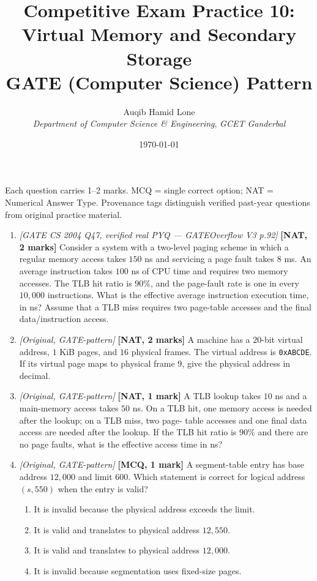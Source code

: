 \documentclass[11pt]{article}
\title{Competitive Exam Practice 10: Virtual Memory and Secondary Storage\\
  \large GATE (Computer Science) Pattern}
\author{Auqib Hamid Lone\\[0.3em]
  \emph{Department of Computer Science \& Engineering}, \emph{GCET Ganderbal}}
\date{\today}
\begin{document}
\maketitle

\noindent Each question carries 1--2 marks. MCQ = single correct option;
NAT = Numerical Answer Type. Provenance tags distinguish verified past-year
questions from original practice material.

\begin{enumerate}
\item[\textbf{Q1}] \textit{[GATE CS 2004 Q47, verified real PYQ ---
GATEOverflow V3 p.92]} \textbf{[NAT, 2 marks]} Consider a system with a
two-level paging scheme in which a regular memory access takes $150$ ns and
servicing a page fault takes $8$ ms. An average instruction takes $100$ ns of
CPU time and requires two memory accesses. The TLB hit ratio is $90\%$, and
the page-fault rate is one in every $10{,}000$ instructions. What is the
effective average instruction execution time, in ns? Assume that a TLB miss
requires two page-table accesses and the final data/instruction access.

\item[\textbf{Q2}] \textit{[Original, GATE-pattern]} \textbf{[NAT, 2 marks]}
A machine has a $20$-bit virtual address, $1$ KiB pages, and $16$ physical
frames. The virtual address is \texttt{0xABCDE}. If its virtual page maps to
physical frame $9$, give the physical address in decimal.

\item[\textbf{Q3}] \textit{[Original, GATE-pattern]} \textbf{[NAT, 1 mark]}
A TLB lookup takes $10$ ns and a main-memory access takes $50$ ns. On a TLB
hit, one memory access is needed after the lookup; on a TLB miss, two page-
table accesses and one final data access are needed after the lookup. If the
TLB hit ratio is $90\%$ and there are no page faults, what is the effective
access time in ns?

\item[\textbf{Q4}] \textit{[Original, GATE-pattern]} \textbf{[MCQ, 1 mark]}
A segment-table entry has base address $12{,}000$ and limit $600$. Which
statement is correct for logical address $(s, 550)$ when the entry is valid?
\begin{enumerate}
  \item[(A)] It is invalid because the physical address exceeds the limit.
  \item[(B)] It is valid and translates to physical address $12{,}550$.
  \item[(C)] It is valid and translates to physical address $12{,}000$.
  \item[(D)] It is invalid because segmentation uses fixed-size pages.
\end{enumerate}


\end{enumerate}
\end{document}
